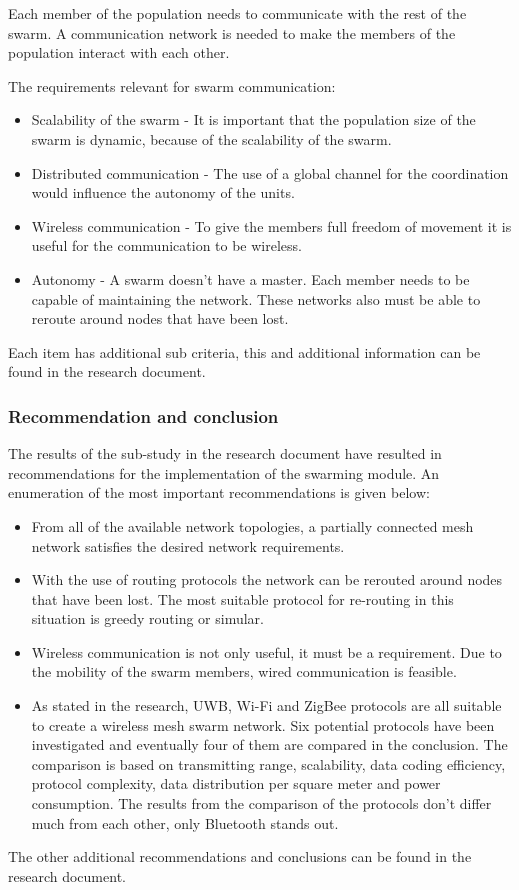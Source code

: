 \documentclass[10pt,a4paper]{article}
\begin{document}
Each member of the population needs to communicate with the rest of the swarm. A communication network is needed to make the members of the population interact with each other.

The requirements relevant for swarm communication:
\begin{itemize}
\setlength\itemsep{0em}
    \item Scalability of the swarm - It is important that the population size of the swarm is
    dynamic, because of the scalability of the swarm.
    \item Distributed communication - The use of a global channel for the coordination would influence the autonomy of the units.\cite{swarmintelligence}
    \item Wireless communication - To give the members full freedom of movement it is useful for the   communication to be wireless.
    \item Autonomy - A swarm doesn't have a master. Each member needs to be capable of maintaining the  network. These networks also must be able to reroute around nodes that have
    been lost.
\end{itemize}
Each item has additional sub criteria, this and additional information can be found in the research document.


\subsubsection{Recommendation and conclusion}
The results of the sub-study in the research document have resulted in recommendations for the implementation of the
swarming module. An enumeration of the most important recommendations is given below:
\begin{itemize}
\setlength\itemsep{0em}
    \item From all of the available network topologies, a partially connected mesh network satisfies the desired network requirements.
    \item With the use of routing protocols the network can be rerouted around nodes that have been lost. The most suitable protocol for re-routing in this situation is greedy routing or simular.
    \item Wireless communication is not only useful, it must be a requirement. Due to the mobility of the swarm members, wired communication is feasible.
    \item As stated in the research, UWB, Wi-Fi and ZigBee protocols are all suitable to create a wireless mesh swarm network. Six potential protocols have been investigated and eventually four of them are compared in the conclusion. The comparison is based on transmitting range, scalability, data coding efficiency, protocol complexity, data distribution per square meter and power consumption. The results from the comparison of the protocols don't differ much from each other, only Bluetooth stands out.
\end{itemize}
The other additional recommendations and conclusions can be found in the research document.
\end{document}
